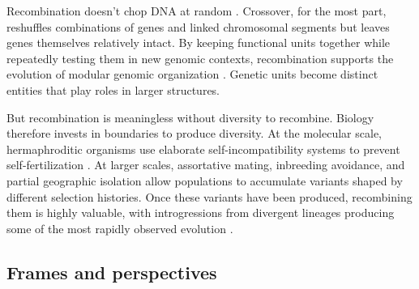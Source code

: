 \documentclass[11pt]{article}
\newcommand{\zeb}[1]{{\footnotesize\textcolor{red}{[Zeb: #1]}}}
\begin{document}
Recombination doesn't chop DNA at random \citep{zickler2015recombination, paigen2010mammalian}. Crossover, for the most part, reshuffles combinations of genes and linked chromosomal segments but leaves genes themselves relatively intact. By keeping functional units together while repeatedly testing them in new genomic contexts, recombination supports the evolution of modular genomic organization \citep{wagner1996perspective, melo2016modularity, kirschner1998evolvability}. Genetic units become distinct entities that play roles in larger structures.

But recombination is meaningless without diversity to recombine. Biology therefore invests in boundaries to produce diversity. At the molecular scale, hermaphroditic organisms use elaborate self-incompatibility systems to prevent self-fertilization \citep{charlesworth2005plant,de1997incompatibility}. At larger scales, assortative mating, inbreeding avoidance, and partial geographic isolation allow populations to accumulate variants shaped by different selection histories. Once these variants have been produced, recombining them is highly valuable, with introgressions from divergent lineages producing some of the most rapidly observed evolution \citep{seehausen2014genomics,marques2019combinatorial}. 



 










\subsection{Frames and perspectives} 

\end{document}
